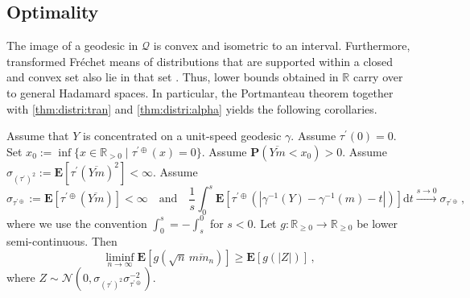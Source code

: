 \documentclass{article}
\newcommand*{\mc}[1]{\mathcal{#1}}
\newcommand{\R}{\mathbb{R}}
\newcommand{\Rp}{\R_{\geq0}}
\newcommand{\Rpp}{\R_{>0}}
\newcommand{\lab}{\left[} %
\newcommand{\rab}{\right]} %
\newcommand{\ab}[1]{\lab #1 \rab} %
\newcommand{\abOf}[1]{\!\ab{#1}} %
\newcommand{\lb}{\left(} %
\newcommand{\rb}{\right)} %
\newcommand{\br}[1]{\lb #1 \rb} %
\newcommand{\brOf}[1]{\!\br{#1}} %
\renewcommand{\Pr}{\mathbf{P}} %
\newcommand{\Prof}[1]{\Pr(#1)}
\newcommand{\E}{\mathbf{E}} %
\newcommand{\Eof}[1]{\E[#1]}
\newcommand{\EOf}[1]{\E\abOf{#1}}
\newcommand{\setByEleInText}[2]{\{#1 \mid #2\}}
\newcommand{\pr}{^\prime}
\newcommand{\eqcm}{\,,} %
\newcommand{\dl}{\mathrm{d}} %
\newcommand{\ol}[2]{\overline{#1#2}}
\newcommand{\dtran}{\tau\pr}
\newcommand{\ddrtran}{\tau^{\prime\oplus}}
\begin{document}
\subsection{Optimality}

The image of a geodesic in $\mc Q$ is convex and isometric to an interval. Furthermore, transformed Fr\'echet means of distributions that are supported within a closed and convex set also lie in that set \cite[Proposition 5.2]{varinequ}. Thus, lower bounds obtained in $\R$ carry over to general Hadamard spaces. In particular, the Portmanteau theorem together with \cref{thm:distri:tran} and \cref{thm:distri:alpha} yields the following corollaries.

\begin{corollary}\label{cor:lower:tran}
    Assume that $Y$ is concentrated on a unit-speed geodesic $\gamma$.
    Assume $\dtran(0) = 0$.
    Set $x_0 := \inf\setByEleInText{x\in\Rpp}{\ddrtran(x)=0}$.
    Assume $\Prof{\ol Ym < x_0} > 0$.
    Assume $\sigma_{(\dtran)^2} := \Eof{\dtran(\ol Ym)^{2}} < \infty$.
    Assume
    \begin{equation}
        \sigma_{\ddrtran} := \Eof{\ddrtran(\ol Ym)} < \infty
        \quad\text{and}\quad
        \frac1s \int_0^s \EOf{\ddrtran(|\gamma^{-1}(Y)-\gamma^{-1}(m)-t|)} \dl t \xrightarrow{s\to0} \sigma_{\ddrtran}
        \eqcm
    \end{equation}
    where we use the convention $\int_0^s = -\int_s^0$ for $s < 0$.
    Let $g \colon \Rp \to \Rp$ be lower semi-continuous.
    Then
    \begin{equation}
        \liminf_{n\to\infty} \EOf{g\brOf{\sqrt{n}\, \ol m{m_n}}} \geq \EOf{g(|Z|)}
        \eqcm
    \end{equation}
    where $Z \sim \mathcal N(0, \sigma_{(\dtran)^2}\sigma_{\ddrtran}^{-2})$.
\end{corollary}
%
\end{document}
